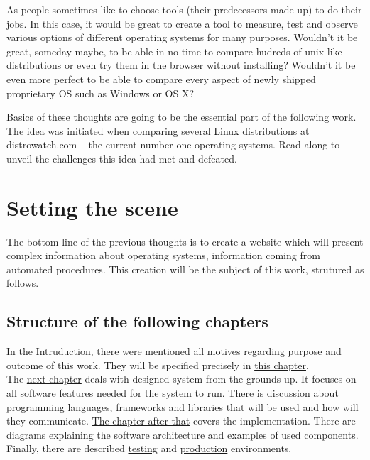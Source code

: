 \documentclass[thesis=B,english]{FITthesis}[2013/04/26]
\begin{document}
\begin{introduction}
As people sometimes like to choose tools (their predecessors made up) to do their jobs. In this case, it would be great to create a tool to measure, test and observe various options of different operating systems for many purposes. Wouldn’t it be great, someday maybe, to be able in no time to compare hudreds of unix-like distributions or even try them in the browser without installing? Wouldn’t it be even more perfect to be able to compare every aspect of newly shipped proprietary OS such as Windows or OS X?

Basics of these thoughts are going to be the essential part of the following work. The idea was initiated when comparing several Linux distributions at distrowatch.com -- the current number one  operating systems. Read along to unveil the challenges this idea had met and defeated.
\end{introduction}

\chapter{Setting the scene}
\label{chapter:setting_the_scene}

The bottom line of the previous thoughts is to create a website which will present complex information about operating systems, information coming from automated procedures. This creation will be the subject of this work, strutured as follows.

\section{Structure of the following chapters}

In the \hyperref[section:introduction]{Intruduction}, there were mentioned all motives regarding purpose and outcome of this work. They will be specified precisely in \hyperref[chapter:setting_the_scene]{this chapter}. \\

The \hyperref[chapter:analysis_and_design]{next chapter} deals with designed system from the grounds up. It focuses on all software features needed for the system to run. There is discussion about programming languages, frameworks and libraries that will be used and how will they communicate. \hyperref[chapter:implementation]{The chapter after that} covers the implementation. There are diagrams explaining the software architecture and examples of used components. Finally, there are described \hyperref[section:testing]{testing} and \hyperref[chapter:production]{production} environments. \\
\end{document}
